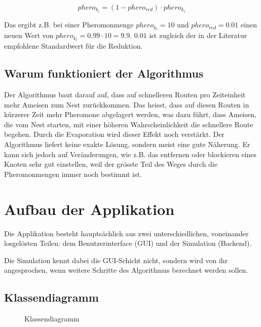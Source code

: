 \[ phero_{k_i} = (1 - phero_{red}) \cdot phero_{k_i} \]

\noindent Das ergibt z.B. bei einer Pheromonmenge $phero_{k_i} = 10$ und
$phero_{red} = 0.01$ einen neuen Wert von $phero_{k_i} = 0.99 \cdot 10 = 9.9$.
$0.01$ ist zugleich der in der Literatur empfohlene Standardwert für die
Reduktion.

\subsection{Warum funktioniert der Algorithmus}

Der Algorithmus baut darauf auf, dass auf schnelleren Routen pro Zeiteinheit
mehr Ameisen zum Nest zurückkommen. Das heisst, dass auf diesen Routen in
kürzerer Zeit mehr Pheromone abgelagert werden, was dazu führt, dass Ameisen,
die vom Nest starten, mit einer höheren Wahrscheinlichkeit die schnellere Route
begehen. Durch die Evaporation wird dieser Effekt noch verstärkt. Der
Algorithmus liefert keine exakte Lösung, sondern meist eine gute Näherung. Er
kann sich jedoch auf Veränderungen, wie z.B. das entfernen oder blockieren eines
Knoten sehr gut einstellen, weil der grösste Teil des Weges durch die
Pheromonmengen immer noch bestimmt ist.

\section{Aufbau der Applikation}

Die Applikation besteht hauptsächlich aus zwei unterschiedlichen, voneinander
losgelösten Teilen: dem Benutzerinterface (GUI) und der Simulation (Backend).

Die Simulation kennt dabei die GUI-Schicht nicht, sondern wird von ihr
angesprochen, wenn weitere Schritte des Algorithmus berechnet werden sollen.

\pagebreak \subsection{Klassendiagramm}

\begin{figure}[h] 
\centering 
{}
\caption{Klassendiagramm} 
\end{figure}

